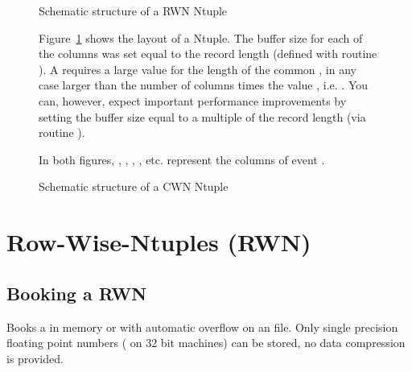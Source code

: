 \begin{figure}[p]
\vspace*{-5mm}
{\centering{}}
\caption{Schematic structure of a RWN Ntuple}
\label{fig:rwn}
{\centering{}}
\caption{Schematic structure of a CWN Ntuple}
\label{fig:cwn}
\newcommand{\III}{\(\sb{\mathtt{i}}\)}

\small

Figure~\ref{fig:cwn} shows the layout of a \CWN{} Ntuple.
The buffer size for each of the columns
 was set equal to the record length 
(defined with routine ).
A \CWN{} requires a large value for the length of the common ,
%
in any case larger than the number of columns
times the value , i.e. .
You can, however, expect important performance improvements by setting
the buffer size  equal to a 
multiple of the record length  (via routine ).

In both figures, \Lit{x\III}, \Lit{y\III}, \Lit{z\III}, 
\Lit{t\III}, etc. represent the columns of event .

\end{figure}

\clearpage

\section{Row-Wise-Ntuples (RWN)}
\label{sec:NtupleRWN}
\subsection{Booking a RWN}
\label{HNTUBOOK}
 
 
\Action Books a \RWN{} in memory or with
automatic overflow on an  file.
Only single precision floating point numbers ( on
32 bit machines) can be stored, no data compression is provided.

